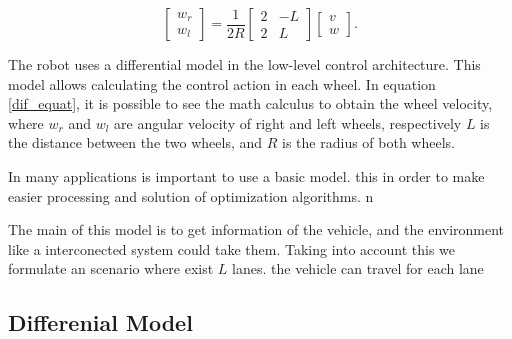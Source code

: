 \begin{equation}
\begin{bmatrix}
w_{r}\\ w_{l}
\end{bmatrix} =  \frac{1}{2R}\begin{bmatrix}
2 & -L\\ 
2 & L
\end{bmatrix} \begin{bmatrix}
v\\ w
\end{bmatrix}.
\label{dif_equat}
\end{equation}

The robot uses a differential model in the low-level control architecture. This model allows calculating the control action in each wheel. In equation \eqref{dif_equat}, it is possible to see the math calculus to obtain the wheel velocity, where $w_{r}$ and $w_{l}$ are angular velocity of right and left wheels, respectively $L$ is the distance between the two wheels, and $R$ is the radius of both wheels. 


In many applications is important to use a basic model. this in order to make easier processing and solution of optimization algorithms. n 

The main of this model is to get information of the vehicle, and the environment like a interconected system could take them. Taking into account this we formulate an scenario where exist $L$ lanes. the vehicle can travel for each lane  



\subsection{Differenial Model}







